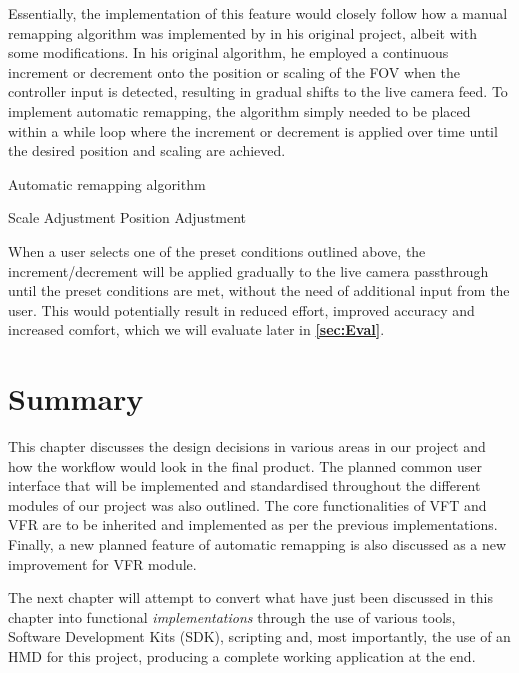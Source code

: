 \documentclass{l4proj}
\begin{document}
Essentially, the implementation of this feature would closely follow how a manual remapping algorithm was implemented by \cite{Russell2023} in his original project, albeit with some modifications. In his original algorithm, he employed a continuous increment or decrement onto the position or scaling of the FOV when the controller input is detected, resulting in gradual shifts to the live camera feed. To implement automatic remapping, the algorithm simply needed to be placed within a while loop where the increment or decrement is applied over time until the desired position and scaling are achieved.

\begin{algorithm}[!h]
\caption{Automatic remapping algorithm}
\label{alg:autoRemapPseudo}


Scale Adjustment\;
Position Adjustment\;

\end{algorithm}

When a user selects one of the preset conditions outlined above, the increment/decrement will be applied gradually to the live camera passthrough until the preset conditions are met, without the need of additional input from the user. This would potentially result in reduced effort, improved accuracy and increased comfort, which we will evaluate later in \textbf{\autoref{sec:Eval}}.



\section{Summary}
This chapter discusses the design decisions in various areas in our project and how the workflow would look in the final product. The planned common user interface that will be implemented and standardised throughout the different modules of our project was also outlined. The core functionalities of VFT and VFR are to be inherited and implemented as per the previous implementations. Finally, a new planned feature of automatic remapping is also discussed as a new improvement for VFR module. 

The next chapter will attempt to convert what have just been discussed in this chapter into functional  \textit{implementations} through the use of various tools, Software Development Kits (SDK), scripting and, most importantly, the use of an HMD for this project, producing a complete working application at the end.
\end{document}
